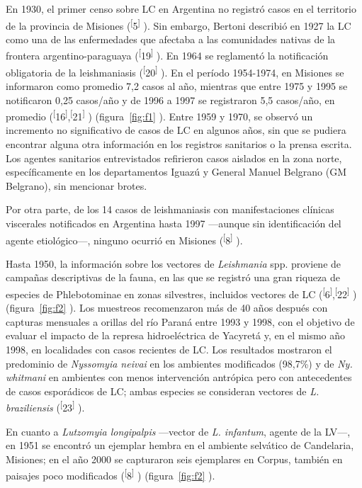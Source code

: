 \documentclass{article}
\begin{document}
En 1930, el primer censo sobre LC en Argentina no registró casos en el
territorio de la provincia de Misiones (\textsuperscript{[}5\textsuperscript{]}
). Sin embargo, Bertoni describió en 1927 la LC como una de las enfermedades que
afectaba a las comunidades nativas de la frontera argentino-paraguaya
(\textsuperscript{[}19\textsuperscript{]}
). En 1964 se reglamentó la notificación obligatoria de la leishmaniasis
(\textsuperscript{[}20\textsuperscript{]}
). En el período 1954-1974, en Misiones se informaron como promedio 7,2 casos al
año, mientras que entre 1975 y 1995 se notificaron 0,25 casos/año y de 1996 a
1997 se registraron 5,5 casos/año, en promedio
(\textsuperscript{[}16\textsuperscript{]},\textsuperscript{[}21\textsuperscript{]}
) (figura~\ref{fig:f1}
). Entre 1959 y 1970, se observó un incremento no significativo de casos de LC
en algunos años, sin que se pudiera encontrar alguna otra información en los
registros sanitarios o la prensa escrita. Los agentes sanitarios entrevistados
refirieron casos aislados en la zona norte, específicamente en los departamentos
Iguazú y General Manuel Belgrano (GM Belgrano), sin mencionar brotes.

Por otra parte, de los 14 casos de leishmaniasis con manifestaciones clínicas
viscerales notificados en Argentina hasta 1997 —aunque sin identificación del
agente etiológico—, ninguno ocurrió en Misiones
(\textsuperscript{[}8\textsuperscript{]}
).

Hasta 1950, la información sobre los vectores de \textit{Leishmania}
spp. proviene de campañas descriptivas de la fauna, en las que se registró una
gran riqueza de especies de Phlebotominae en zonas silvestres, incluidos
vectores de LC (\textsuperscript{[}6\textsuperscript{]},\textsuperscript{[}22\textsuperscript{]}
) (figura~\ref{fig:f2}
). Los muestreos recomenzaron más de 40 años después con capturas mensuales a
orillas del río Paraná entre 1993 y 1998, con el objetivo de evaluar el impacto
de la represa hidroeléctrica de Yacyretá y, en el mismo año 1998, en localidades
con casos recientes de LC. Los resultados mostraron el predominio de
\textit{Nyssomyia neivai}
en los ambientes modificados (98,7\%) y de \textit{Ny. whitmani}
en ambientes con menos intervención antrópica pero con antecedentes de casos
esporádicos de LC; ambas especies se consideran vectores de \textit{L.
braziliensis}
(\textsuperscript{[}23\textsuperscript{]}
).

En cuanto a \textit{Lutzomyia longipalpis}
—vector de \textit{L. infantum}, agente de la LV—, en 1951 se encontró un ejemplar hembra en el ambiente
selvático de Candelaria, Misiones; en el año 2000 se capturaron seis ejemplares
en Corpus, también en paisajes poco modificados
(\textsuperscript{[}8\textsuperscript{]}
) (figura~\ref{fig:f2}
).
\end{document}
